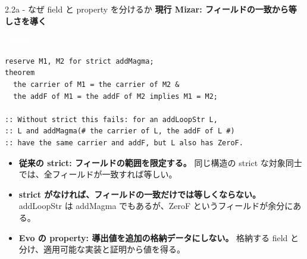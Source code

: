 \documentclass[dvipdfmx,aspectratio=169,11pt]{beamer}
\newcommand{\statusbadge}[2]{\colorbox{#1}{\textcolor{white}{\strut\scriptsize\sffamily\bfseries #2}}}
\newcommand{\badgeSketch}{\statusbadge{orange!75!black}{sketch}}
\begin{document}
\begin{frame}[fragile,t]{2.2a - なぜ field と property を分けるか}
\smallskip
\textbf{現行 Mizar: フィールドの一致から等しさを導く}~\badgeSketch
\begin{lstlisting}[language={mizar},basicstyle=\ttfamily\footnotesize]
reserve M1, M2 for strict addMagma;
theorem
  the carrier of M1 = the carrier of M2 &
  the addF of M1 = the addF of M2 implies M1 = M2;

:: Without strict this fails: for an addLoopStr L,
:: L and addMagma(# the carrier of L, the addF of L #)
:: have the same carrier and addF, but L also has ZeroF.
\end{lstlisting}
\begin{itemize}
\setlength{\itemsep}{1pt}
\setlength{\parsep}{0pt}
\setlength{\parskip}{0pt}
\item \textcolor{blue!55!black}{\textbf{従来の strict: フィールドの範囲を限定する。}} 同じ構造の strict な対象同士では、全フィールドが一致すれば等しい。
\item \textcolor{blue!55!black}{\textbf{strict がなければ、フィールドの一致だけでは等しくならない。}} addLoopStr は addMagma でもあるが、ZeroF というフィールドが余分にある。
\item \textcolor{blue!55!black}{\textbf{Evo の property: 導出値を追加の格納データにしない。}} 格納する field と分け、適用可能な実装と証明から値を得る。
\end{itemize}
\end{frame}
\end{document}
